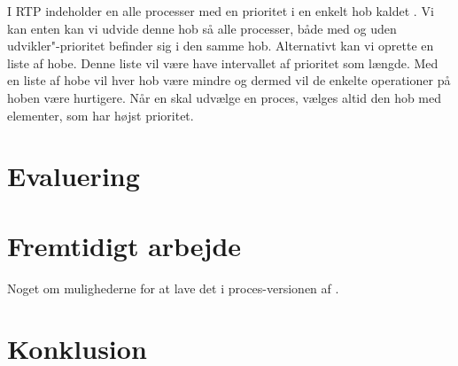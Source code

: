 I RTP  indeholder  \sched en alle processer med en prioritet i en enkelt hob kaldet . Vi kan enten kan vi udvide denne hob så alle processer, både med og uden udvikler"-prioritet befinder sig i den samme hob. Alternativt kan vi oprette en liste af hobe. Denne liste vil være have intervallet af prioritet som længde.
Med en liste af hobe vil hver hob være mindre og dermed vil de enkelte operationer på hoben være hurtigere. Når \sched en skal udvælge en proces, vælges altid den hob med elementer, som har højst prioritet.



    
\section{Evaluering}
\section{Fremtidigt arbejde}
Noget om mulighederne for at lave det i proces-versionen af \pycsp.
\section{Konklusion}

